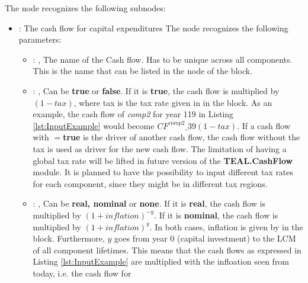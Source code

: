\begin{itemize}
      The  node recognizes the following subnodes:
      \begin{itemize}
        \item {}:
          The cash flow for capital expenditures
          The  node recognizes the following parameters:
            \begin{itemize}
              \item {}: , 
                The name of the Cash flow. Has to be unique across all components. This is the name
                that can be listed in the                              node of
                the  block.
              \item {}: , 
                Can be \textbf{true} or \textbf{false}. If it is \textbf{true}, the cash flow is
                multiplied by $(1-tax)$, where tax                                 is the tax rate
                given in  in the 
                block. As an example, the cash flow of \textit{comp2} for year 119 in Listing
                \ref{lst:InputExample} would become $CF^{comp2}\_{39}(1-tax)$.
                If a cash flow with $=$\textbf{true} is the driver of another cash
                flow, the cash flow without the tax is used as driver for the new cash flow.
                The limitation of having a global tax rate will be lifted in future version of the
                \textbf{TEAL.CashFlow} module. It is planned to have the possibility to
                input different tax rates for each component, since they might be in different tax
                regions.
              \item {}: , 
                Can be \textbf{real, nominal} or \textbf{none}. If it is \textbf{real}, the cash
                flow is multiplied by                               $(1+inflation)^{-y}$. If it is
                \textbf{nominal}, the cash flow is multiplied by $(1+inflation)^y$.
                In both cases, inflation is given by  in the 
                block. Furthermore, $y$ goes from year 0 (capital investment)
                to the LCM of all component lifetimes.                               This means that
                the cash flows as expressed in Listing \ref{lst:InputExample} are multiplied with
                the infloation seen from today, i.e. the cash                               flow for

\end{itemize}
\end{itemize}
\end{itemize}
